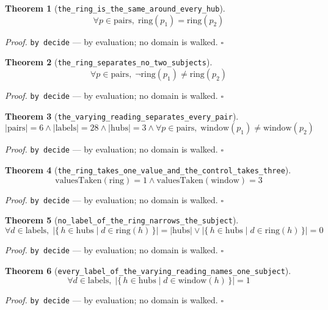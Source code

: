 \documentclass[11pt]{article}
\newtheorem{theorem}{Theorem}[section]
\begin{document}
\begin{theorem}[\texttt{the\_ring\_is\_the\_same\_around\_every\_hub}]
\[ \forall p \in \mathrm{pairs},\; \mathrm{ring}\mathopen{}\left(p_{1}\right) = \mathrm{ring}\mathopen{}\left(p_{2}\right) \]
\end{theorem}
\noindent\emph{Proof.} \texttt{by decide} --- by evaluation; no domain is walked. \hfill$\square$

\begin{theorem}[\texttt{the\_ring\_separates\_no\_two\_subjects}]
\[ \forall p \in \mathrm{pairs},\; \lnot \mathrm{ring}\mathopen{}\left(p_{1}\right) \neq \mathrm{ring}\mathopen{}\left(p_{2}\right) \]
\end{theorem}
\noindent\emph{Proof.} \texttt{by decide} --- by evaluation; no domain is walked. \hfill$\square$

\begin{theorem}[\texttt{the\_varying\_reading\_separates\_every\_pair}]
\[ \left|\mathrm{pairs}\right| = 6 \land \left|\mathrm{labels}\right| = 28 \land \left|\mathrm{hubs}\right| = 3 \land \forall p \in \mathrm{pairs},\; \mathrm{window}\mathopen{}\left(p_{1}\right) \neq \mathrm{window}\mathopen{}\left(p_{2}\right) \]
\end{theorem}
\noindent\emph{Proof.} \texttt{by decide} --- by evaluation; no domain is walked. \hfill$\square$

\begin{theorem}[\texttt{the\_ring\_takes\_one\_value\_and\_the\_control\_takes\_three}]
\[ \mathrm{valuesTaken}\mathopen{}\left(\mathrm{ring}\right) = 1 \land \mathrm{valuesTaken}\mathopen{}\left(\mathrm{window}\right) = 3 \]
\end{theorem}
\noindent\emph{Proof.} \texttt{by decide} --- by evaluation; no domain is walked. \hfill$\square$

\begin{theorem}[\texttt{no\_label\_of\_the\_ring\_narrows\_the\_subject}]
\[ \forall d \in \mathrm{labels},\; \left|\{\, h \in \mathrm{hubs} \mid d \in \mathrm{ring}\mathopen{}\left(h\right) \,\}\right| = \left|\mathrm{hubs}\right| \lor \left|\{\, h \in \mathrm{hubs} \mid d \in \mathrm{ring}\mathopen{}\left(h\right) \,\}\right| = 0 \]
\end{theorem}
\noindent\emph{Proof.} \texttt{by decide} --- by evaluation; no domain is walked. \hfill$\square$

\begin{theorem}[\texttt{every\_label\_of\_the\_varying\_reading\_names\_one\_subject}]
\[ \forall d \in \mathrm{labels},\; \left|\{\, h \in \mathrm{hubs} \mid d \in \mathrm{window}\mathopen{}\left(h\right) \,\}\right| = 1 \]
\end{theorem}
\noindent\emph{Proof.} \texttt{by decide} --- by evaluation; no domain is walked. \hfill$\square$
\end{document}
